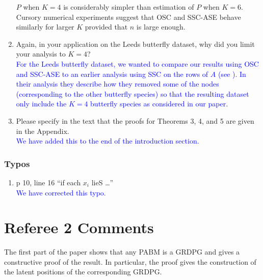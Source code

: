 \documentclass[
]{article}
\providecommand{\tightlist}{%
  \setlength{\itemsep}{0pt}\setlength{\parskip}{0pt}}
\begin{document}
\begin{enumerate}
{  $P$ when $K = 4$ is considerably simpler than estimation of $P$ when
  $K = 6$. Cursory numerical experiments suggest that OSC and
  SSC-ASE behave similarly for larger $K$ provided that $n$ is large enough. 
  }
\item
  Again, in your application on the Leeds butterfly dataset, why did you
  limit your analysis to \(K = 4\)?\\
  \textcolor{blue}{
  For the Leeds butterfly dataset, we wanted to compare our results
  using OSC and SSC-ASE to an earlier analysis using SSC on the rows of
  $A$ (see \citep{noroozi2019estimation}). In their analysis they
  describe how they removed some of the nodes (corresponding to the
  other butterfly species) so that the resulting dataset only include the
  $K = 4$ butterfly species as considered in our paper.}
\item
  Please specify in the text that the proofs for Theorems 3, 4, and 5
  are given in the Appendix.\\
  \textcolor{blue}{
  We have added this to the end of the introduction section.
  }
\end{enumerate}

\hypertarget{typos}{%
\subsubsection{Typos}\label{typos}}

\begin{enumerate}
\def\labelenumi{\arabic{enumi}.}
\tightlist
\item
  p 10, line 16 ``if each \(x_i\) lieS \ldots{}''\\
  \textcolor{blue}{
  We have corrected this typo. 
  }
\end{enumerate}

\hypertarget{referee-2-comments}{%
\section{Referee 2 Comments}\label{referee-2-comments}}

The first part of the paper shows that any PABM is a GRDPG and gives a
constructive proof of the result. In particular, the proof gives the
construction of the latent positions of the corresponding GRDPG.
\end{document}
